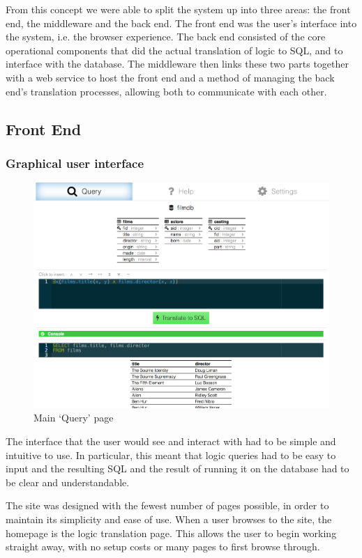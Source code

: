 \documentclass[a4paper, 11pt]{article}
\begin{document}
    From this concept we were able to split the system up into three areas: the
    front end, the middleware and the back end. The front end was the user's
    interface into the system, i.e. the browser experience. The back end
    consisted of the core operational components that did the actual translation
    of logic to SQL, and to interface with the database. The middleware then
    links these two parts together with a web service to host the front end and
    a method of managing the back end's translation processes, allowing both to
    communicate with each other.

  \subsection{Front End}
    \subsubsection{Graphical user interface}
      \begin{figure}[h!]
        \includegraphics[width=\textwidth]{images/site_query.png}
        \caption{Main `Query' page}
      \end{figure}
      The interface that the user would see and interact with had to be simple
      and intuitive to use. In particular, this meant that logic queries had to
      be easy to input and the resulting SQL and the result of running it on
      the database had to be clear and understandable.

      The site was designed with the fewest number of pages possible, in order
      to maintain its simplicity and ease of use. When a user browses to the
      site, the homepage is the logic translation page. This allows the user to
      begin working straight away, with no setup costs or many pages to first
      browse through.
\end{document}
